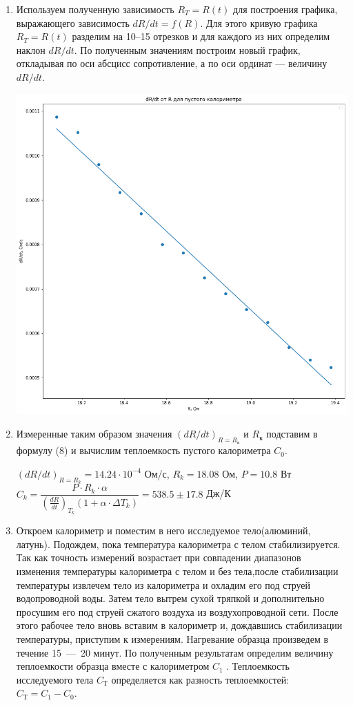 \documentclass[12pt,a4paper]{article}
\begin{document}
\begin{enumerate}
		\item Используем полученную зависимость $R_T = R(t)$ для построения графика, выражающего зависимость $dR/dt = f (R)$. Для этого кривую графика $R_T = R(t)$ разделим на 10–15 отрезков и для каждого из них определим наклон $dR/dt$. По полученным значениям построим новый график, откладывая по оси абсцисс сопротивление, а по оси ординат — величину $dR/dt$.
		\begin{center}
			\includegraphics[scale=0.5]{g1.png}
		\end{center}
		
		\item Измеренные таким образом значения $(dR/dt)_{R=R_к}$ и $R_к$ подставим в формулу (8) и вычислим теплоемкость пустого калориметра $C_0$.
		
		$(dR/dt)_{R=R_k} = 14.24 \cdot 10^{-4}$ Ом/с, $R_k = 18.08$ Ом, $P = 10.8$ Вт \\
		$C_k = \dfrac{P \cdot R_k \cdot \alpha}{\left( \frac{dR}{dt} \right)_{T_k} \left( 1 + \alpha \cdot \Delta T_k \right)} = 538.5 \pm 17.8$ Дж/К
		
		\item Откроем калориметр и поместим в него исследуемое тело(алюминий, латунь). Подождем, пока температура калориметра с телом стабилизируется. Так как точность измерений возрастает при совпадении диапазонов изменения температуры калориметра с телом и без тела,после стабилизации температуры извлечем тело из калориметра и охладим его под струей водопроводной воды. Затем тело вытрем сухой тряпкой и дополнительно просушим его под струей сжатого воздуха из воздухопроводной сети. После этого рабочее тело вновь вставим в калориметр и, дождавшись стабилизации температуры, приступим к измерениям. Нагревание образца произведем в течение 15~---~20 минут. По полученным результатам определим величину теплоемкости образца вместе с калориметром $C_1$ . Теплоемкость исследуемого тела $C_Т$ определяется как разность теплоемкостей: $C_Т = C_1 - C_0$.
		

\end{enumerate}
\end{document}
